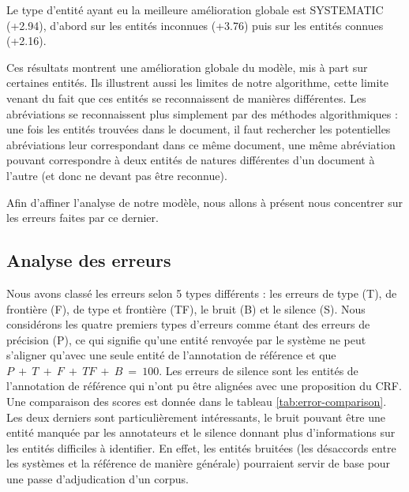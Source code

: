 \documentclass[12pt,a4paper,times,twoside,openright]{report}
\begin{document}
Le type d'entité ayant eu la meilleure amélioration globale est SYSTEMATIC (+2.94), d'abord sur les entités inconnues (+3.76) puis sur les entités connues (+2.16).

Ces résultats montrent une amélioration globale du modèle, mis à part sur certaines entités. Ils illustrent aussi les limites de notre algorithme, cette limite venant du fait que ces entités se reconnaissent de manières différentes. Les abréviations se reconnaissent plus simplement par des méthodes algorithmiques : une fois les entités trouvées dans le document, il faut rechercher les potentielles abréviations leur correspondant dans ce même document, une même abréviation pouvant correspondre à deux entités de natures différentes d'un document à l'autre (et donc ne devant pas être reconnue).

Afin d'affiner l'analyse de notre modèle, nous allons à présent nous concentrer sur les erreurs faites par ce dernier.



        \subsection{Analyse des erreurs}
        \label{subsec:morphology-error-analysis}
Nous avons classé les erreurs selon 5 types différents : les erreurs de type (T), de frontière (F), de type et frontière (TF), le bruit (B) et le silence (S). Nous considérons les quatre premiers types d'erreurs comme étant des erreurs de précision (P), ce qui signifie qu'une entité renvoyée par le système ne peut s'aligner qu'avec une seule entité de l'annotation de référence et que $P\ +\ T\ +\ F\ +\ TF\ +\ B\ =\ 100$. Les erreurs de silence sont les entités de l'annotation de référence qui n'ont pu être alignées avec une proposition du CRF. Une comparaison des scores est donnée dans le tableau \ref{tab:error-comparison}. Les deux derniers sont particulièrement intéressants, le bruit pouvant être une entité manquée par les annotateurs et le silence donnant plus d'informations sur les entités difficiles à identifier. En effet, les entités bruitées (les désaccords entre les systèmes et la référence de manière générale) pourraient servir de base pour une passe d'adjudication d'un corpus.
\end{document}
